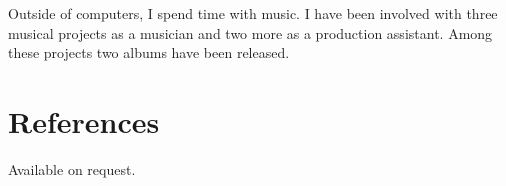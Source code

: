 \documentclass[margintitle,line]{res}
\begin{document}
\begin{resume}
Outside of computers, I spend time with music. I have been involved with three musical projects as a musician and two more as a production assistant. Among these projects two albums have been released. 




\section{References}

Available on request.

\end{resume}
\end{document}
